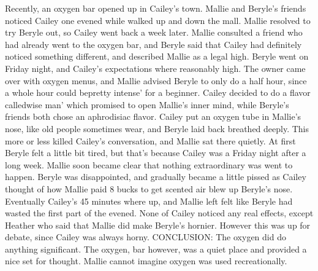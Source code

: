 \documentclass[12pt]{book}
\begin{document}
Recently, an oxygen bar opened up in Cailey's town. Mallie and Beryle's friends noticed Cailey one evened while walked up and down the mall. Mallie resolved to try Beryle out, so Cailey went back a week later. Mallie consulted a friend who had already went to the oxygen bar, and Beryle said that Cailey had definitely noticed something different, and described Mallie as a legal high. Beryle went on Friday night, and Cailey's expectations where reasonably high. The owner came over with oxygen menus, and Mallie advised Beryle to only do a half hour, since a whole hour could bepretty intense' for a beginner. Cailey decided to do a flavor calledwise man' which promised to open Mallie's inner mind, while Beryle's friends both chose an aphrodisiac flavor. Cailey put an oxygen tube in Mallie's nose, like old people sometimes wear, and Beryle laid back breathed deeply. This more or less killed Cailey's conversation, and Mallie sat there quietly. At first Beryle felt a little bit tired, but that's because Cailey was a Friday night after a long week. Mallie soon became clear that nothing extraordinary was went to happen. Beryle was disappointed, and gradually became a little pissed as Cailey thought of how Mallie paid 8 bucks to get scented air blew up Beryle's nose. Eventually Cailey's 45 minutes where up, and Mallie left felt like Beryle had wasted the first part of the evened. None of Cailey noticed any real effects, except Heather who said that Mallie did make Beryle's hornier. However this was up for debate, since Cailey was always horny. CONCLUSION: The oxygen did do anything significant. The oxygen, bar however, was a quiet place and provided a nice set for thought. Mallie cannot imagine oxygen was used recreationally.
\end{document}
